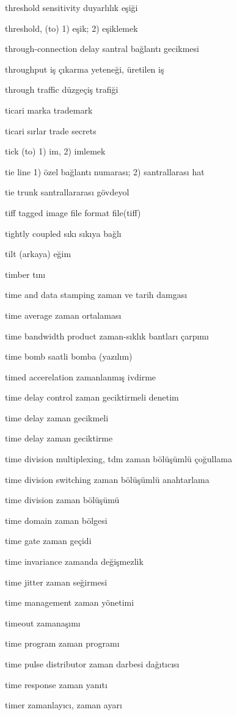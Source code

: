 \documentclass[12pt,fleqn]{article}\usepackage{../../common}
\begin{document}
threshold sensitivity duyarlılık eşiği

threshold, (to) 1) eşik; 2) eşiklemek

through-connection delay santral bağlantı gecikmesi

throughput iş çıkarma yeteneği, üretilen iş

through traffic düzgeçiş trafiği

ticari marka trademark

ticari sırlar trade secrets

tick (to) 1) im, 2) imlemek

tie line 1) özel bağlantı numarası; 2) santrallarası hat

tie trunk santrallararası gövdeyol

tiff tagged image file format file(tiff)

tightly coupled sıkı sıkıya bağlı

tilt (arkaya) eğim

timber tını

time and data stamping zaman ve tarih damgası

time average zaman ortalaması

time bandwidth product zaman-sıklık bantları çarpımı

time bomb saatli bomba (yazılım)

timed accerelation zamanlanmış ivdirme

time delay control zaman geciktirmeli denetim

time delay zaman gecikmeli

time delay zaman geciktirme

time division multiplexing, tdm zaman bölüşümlü çoğullama

time division switching zaman bölüşümlü anahtarlama

time division zaman bölüşümü

time domain zaman bölgesi

time gate zaman geçidi

time invariance zamanda değişmezlik

time jitter zaman seğirmesi

time management zaman yönetimi

timeout zamanaşımı

time program zaman programı

time pulse distributor zaman darbesi dağıtıcısı

time response zaman yanıtı

timer zamanlayıcı, zaman ayarı
\end{document}
